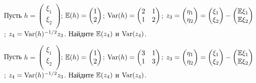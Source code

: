 \begin{problem}
Пусть $h =  \begin{pmatrix}
\xi_1 \\
\xi_2 \\
\end{pmatrix} $; $\mathbb{E} (h) =  \begin{pmatrix}
1\\
2\\
\end{pmatrix} $; $\operatorname{Var} (h) =  \begin{pmatrix}
2 & 1 \\
1 & 2 \\
\end{pmatrix} $; $z_3 =  \begin{pmatrix}
\eta_1 \\
\eta_2 \\
\end{pmatrix}  =  \begin{pmatrix}
\xi_1 \\
\xi_2 \\
\end{pmatrix}  -  \begin{pmatrix}
\mathbb{E} \xi_1 \\
\mathbb{E} \xi_2 \\
\end{pmatrix} $; $z_4 = \operatorname{Var} (h)^{-1/2} z_3$. Найдите $\mathbb{E} (z_4)$ и $\operatorname{Var} (z_4)$.


\begin{sol}
\end{sol}
\end{problem}




\begin{problem}
Пусть $h =  \begin{pmatrix}
\xi_1 \\
\xi_2 \\
\end{pmatrix} $; $\mathbb{E} (h) =  \begin{pmatrix}
1\\
2\\
\end{pmatrix} $; $\operatorname{Var} (h) =  \begin{pmatrix}
3 & 1 \\
1 & 3 \\
\end{pmatrix} $; $z_3 =  \begin{pmatrix}
\eta_1 \\
\eta_2 \\
\end{pmatrix}  =  \begin{pmatrix}
\xi_1 \\
\xi_2 \\
\end{pmatrix}  -  \begin{pmatrix}
\mathbb{E} \xi_1 \\
\mathbb{E} \xi_2 \\
\end{pmatrix} $; $z_4 = \operatorname{Var} (h)^{-1/2} z_3$. Найдите $\mathbb{E} (z_4)$ и $\operatorname{Var} (z_4)$.


\begin{sol}
\end{sol}
\end{problem}


